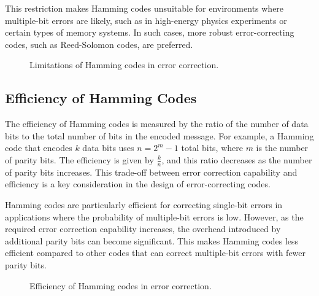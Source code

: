 \documentclass[11pt,a4paper]{article}
\begin{document}
This restriction makes Hamming codes unsuitable for environments where multiple-bit errors are likely, such as in high-energy physics experiments or certain types of memory systems. In such cases, more robust error-correcting codes, such as Reed-Solomon codes, are preferred.

\begin{figure}[h!]
\centering
{}
\caption{Limitations of Hamming codes in error correction.}
\label{fig:hamming-code-limitations}
\end{figure}

\subsection{Efficiency of Hamming Codes}

The efficiency of Hamming codes is measured by the ratio of the number of data bits to the total number of bits in the encoded message. For example, a Hamming code that encodes $ k $ data bits uses $ n = 2^m - 1 $ total bits, where $ m $ is the number of parity bits. The efficiency is given by $ \frac{k}{n} $, and this ratio decreases as the number of parity bits increases. This trade-off between error correction capability and efficiency is a key consideration in the design of error-correcting codes.

Hamming codes are particularly efficient for correcting single-bit errors in applications where the probability of multiple-bit errors is low. However, as the required error correction capability increases, the overhead introduced by additional parity bits can become significant. This makes Hamming codes less efficient compared to other codes that can correct multiple-bit errors with fewer parity bits.

\begin{figure}[h!]
\centering
{}
\caption{Efficiency of Hamming codes in error correction.}
\label{fig:hamming-code-efficiency}
\end{figure}
\end{document}
